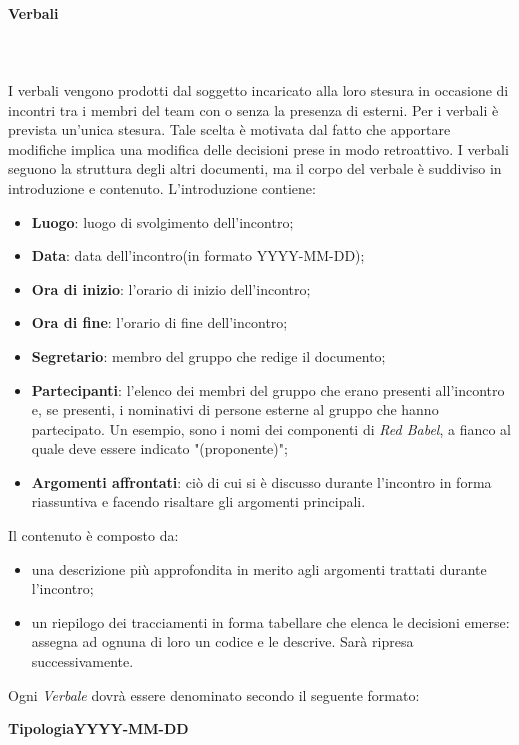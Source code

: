 		\paragraph{Verbali} \mbox{}\\ \mbox{}\\
		I verbali vengono prodotti dal soggetto incaricato alla loro stesura in occasione di incontri tra i membri del team con o senza la presenza di esterni. Per i verbali è prevista un'unica stesura. Tale	scelta è motivata dal fatto che apportare modifiche implica una modifica delle decisioni prese in modo retroattivo.
		I verbali seguono la struttura degli altri documenti, ma il corpo del verbale è suddiviso in introduzione e contenuto.
		L'introduzione contiene:
		\begin{itemize}
			\item \textbf{Luogo}: luogo di svolgimento dell'incontro;
			\item \textbf{Data}: data dell'incontro(in formato YYYY-MM-DD);
			\item \textbf{Ora di inizio}: l'orario di inizio dell'incontro;
			\item \textbf{Ora di fine}: l'orario di fine dell'incontro;
			\item \textbf{Segretario}: membro del gruppo che redige il documento;
			\item \textbf{Partecipanti}: l'elenco dei membri del gruppo che erano presenti all'incontro e, se presenti, i nominativi di persone esterne al gruppo che hanno partecipato. Un esempio, sono i nomi dei componenti di \textit{Red Babel}, a fianco al quale deve essere indicato "(proponente)";
			\item \textbf{Argomenti affrontati}: ciò di cui si è discusso durante l'incontro in forma riassuntiva e facendo risaltare gli argomenti principali.
		\end{itemize}
	Il contenuto è composto da:
	\begin{itemize}
		\item una descrizione più approfondita in merito agli argomenti trattati durante l'incontro;
		\item un riepilogo dei tracciamenti in forma tabellare che elenca le decisioni emerse: assegna ad ognuna di loro un codice e le descrive. Sarà ripresa successivamente.
	\end{itemize}
		Ogni \textit{Verbale} dovrà essere denominato secondo il seguente formato: \newline \newline
		\centerline{\textbf{TipologiaYYYY-MM-DD}} \newline \newline
